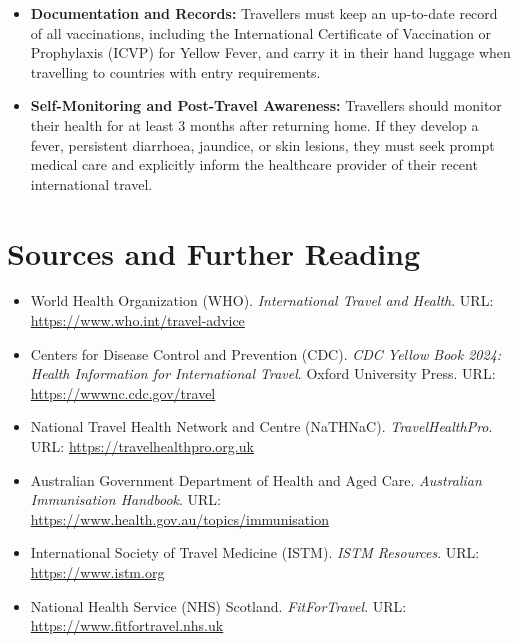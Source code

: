 \begin{itemize}
    \item \textbf{Documentation and Records:} Travellers must keep an up-to-date record of all vaccinations, including the International Certificate of Vaccination or Prophylaxis (ICVP) for Yellow Fever, and carry it in their hand luggage when travelling to countries with entry requirements.
    \item \textbf{Self-Monitoring and Post-Travel Awareness:} Travellers should monitor their health for at least 3 months after returning home. If they develop a fever, persistent diarrhoea, jaundice, or skin lesions, they must seek prompt medical care and explicitly inform the healthcare provider of their recent international travel.
\end{itemize}

\section*{Sources and Further Reading}
\begin{itemize}
    \item World Health Organization (WHO). \textit{International Travel and Health}. URL: \url{https://www.who.int/travel-advice}
    \item Centers for Disease Control and Prevention (CDC). \textit{CDC Yellow Book 2024: Health Information for International Travel}. Oxford University Press. URL: \url{https://wwwnc.cdc.gov/travel}
    \item National Travel Health Network and Centre (NaTHNaC). \textit{TravelHealthPro}. URL: \url{https://travelhealthpro.org.uk}
    \item Australian Government Department of Health and Aged Care. \textit{Australian Immunisation Handbook}. URL: \url{https://www.health.gov.au/topics/immunisation}
    \item International Society of Travel Medicine (ISTM). \textit{ISTM Resources}. URL: \url{https://www.istm.org}
    \item National Health Service (NHS) Scotland. \textit{FitForTravel}. URL: \url{https://www.fitfortravel.nhs.uk}
\end{itemize}